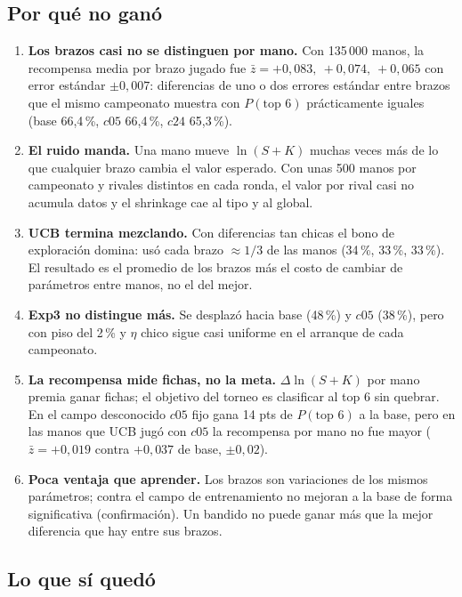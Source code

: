 \documentclass[10.5pt,a4paper]{article}
\begin{document}
\subsection{Por qué no ganó}

\begin{enumerate}[leftmargin=1.4em,itemsep=2pt]
\item \textbf{Los brazos casi no se distinguen por mano.} Con 135\,000 manos, la recompensa media por brazo jugado fue $\bar z=+0{,}083,\ +0{,}074,\ +0{,}065$ con error estándar $\pm0{,}007$: diferencias de uno o dos errores estándar entre brazos que el mismo campeonato muestra con $P(\text{top 6})$ prácticamente iguales (base 66,4\,\%, $c05$ 66,4\,\%, $c24$ 65,3\,\%).
\item \textbf{El ruido manda.} Una mano mueve $\ln(S+K)$ muchas veces más de lo que cualquier brazo cambia el valor esperado. Con unas 500 manos por campeonato y rivales distintos en cada ronda, el valor por rival casi no acumula datos y el shrinkage cae al tipo y al global.
\item \textbf{UCB termina mezclando.} Con diferencias tan chicas el bono de exploración domina: usó cada brazo $\approx 1/3$ de las manos (34\,\%, 33\,\%, 33\,\%). El resultado es el promedio de los brazos más el costo de cambiar de parámetros entre manos, no el del mejor.
\item \textbf{Exp3 no distingue más.} Se desplazó hacia base (48\,\%) y $c05$ (38\,\%), pero con piso del 2\,\% y $\eta$ chico sigue casi uniforme en el arranque de cada campeonato.
\item \textbf{La recompensa mide fichas, no la meta.} $\Delta\ln(S+K)$ por mano premia ganar fichas; el objetivo del torneo es clasificar al top 6 sin quebrar. En el campo desconocido $c05$ fijo gana 14 pts de $P(\text{top 6})$ a la base, pero en las manos que UCB jugó con $c05$ la recompensa por mano no fue mayor ($\bar z=+0{,}019$ contra $+0{,}037$ de base, $\pm0{,}02$).
\item \textbf{Poca ventaja que aprender.} Los brazos son variaciones de los mismos parámetros; contra el campo de entrenamiento no mejoran a la base de forma significativa (confirmación). Un bandido no puede ganar más que la mejor diferencia que hay entre sus brazos.
\end{enumerate}

\subsection{Lo que sí quedó}
\end{document}

